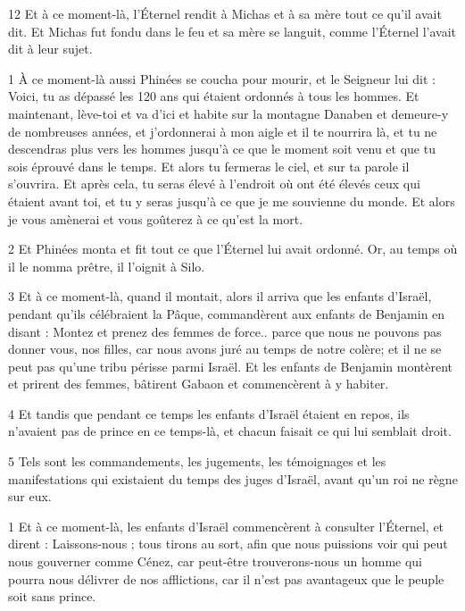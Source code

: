 \par 12 Et à ce moment-là, l'Éternel rendit à Michas et à sa mère tout ce qu'il avait dit. Et Michas fut fondu dans le feu et sa mère se languit, comme l'Éternel l'avait dit à leur sujet.


\par 1 À ce moment-là aussi Phinées se coucha pour mourir, et le Seigneur lui dit : Voici, tu as dépassé les 120 ans qui étaient ordonnés à tous les hommes. Et maintenant, lève-toi et va d'ici et habite sur la montagne Danaben et demeure-y de nombreuses années, et j'ordonnerai à mon aigle et il te nourrira là, et tu ne descendras plus vers les hommes jusqu'à ce que le moment soit venu et que tu sois éprouvé dans le temps. Et alors tu fermeras le ciel, et sur ta parole il s'ouvrira. Et après cela, tu seras élevé à l'endroit où ont été élevés ceux qui étaient avant toi, et tu y seras jusqu'à ce que je me souvienne du monde. Et alors je vous amènerai et vous goûterez à ce qu'est la mort.

\par 2 Et Phinées monta et fit tout ce que l'Éternel lui avait ordonné. Or, au temps où il le nomma prêtre, il l'oignit à Silo.

\par 3 Et à ce moment-là, quand il montait, alors il arriva que les enfants d'Israël, pendant qu'ils célébraient la Pâque, commandèrent aux enfants de Benjamin en disant : Montez et prenez des femmes de force.. parce que nous ne pouvons pas donner vous, nos filles, car nous avons juré au temps de notre colère; et il ne se peut pas qu'une tribu périsse parmi Israël. Et les enfants de Benjamin montèrent et prirent des femmes, bâtirent Gabaon et commencèrent à y habiter.

\par 4 Et tandis que pendant ce temps les enfants d'Israël étaient en repos, ils n'avaient pas de prince en ce temps-là, et chacun faisait ce qui lui semblait droit.

\par 5 Tels sont les commandements, les jugements, les témoignages et les manifestations qui existaient du temps des juges d'Israël, avant qu'un roi ne règne sur eux.


\par 1 Et à ce moment-là, les enfants d'Israël commencèrent à consulter l'Éternel, et dirent : Laissons-nous ; tous tirons au sort, afin que nous puissions voir qui peut nous gouverner comme Cénez, car peut-être trouverons-nous un homme qui pourra nous délivrer de nos afflictions, car il n'est pas avantageux que le peuple soit sans prince.

